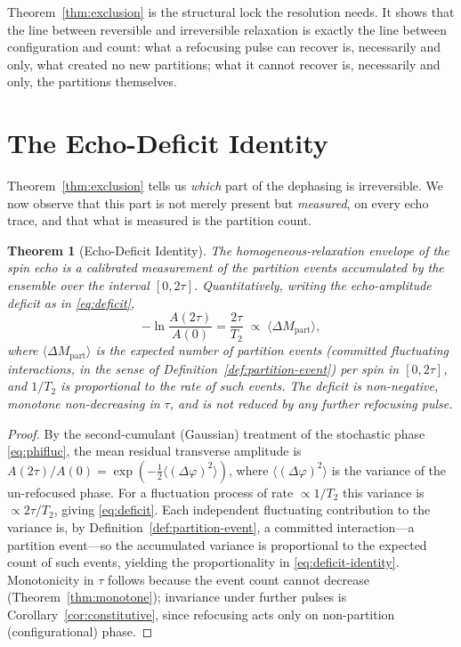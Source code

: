 \documentclass[11pt,a4paper]{article}
\theoremstyle{thmstyle}
\newtheorem{theorem}{Theorem}[section]
\theoremstyle{definition}
\theoremstyle{remark}
\newcommand{\Ttwo}{T_{2}}
\newcommand{\Count}{M}
\begin{document}
Theorem~\ref{thm:exclusion} is the structural lock the resolution
needs. It shows that the line between reversible and irreversible
relaxation is exactly the line between configuration and count: what a
refocusing pulse can recover is, necessarily and only, what created no
new partitions; what it cannot recover is, necessarily and only, the
partitions themselves.

\section{The Echo-Deficit Identity}
\label{sec:deficit}

Theorem~\ref{thm:exclusion} tells us \emph{which} part of the dephasing
is irreversible. We now observe that this part is not merely present but
\emph{measured}, on every echo trace, and that what is measured is the
partition count.

\begin{theorem}[Echo-Deficit Identity]
\label{thm:deficit}
The homogeneous-relaxation envelope of the spin echo is a calibrated
measurement of the partition events accumulated by the ensemble over the
interval $[0,2\tau]$. Quantitatively, writing the echo-amplitude deficit
as in \eqref{eq:deficit},
\begin{equation}
-\ln\frac{A(2\tau)}{A(0)} = \frac{2\tau}{\Ttwo}
\;\propto\; \langle \Delta\Count_{\mathrm{part}}\rangle,
\label{eq:deficit-identity}
\end{equation}
where $\langle\Delta\Count_{\mathrm{part}}\rangle$ is the expected number
of partition events (committed fluctuating interactions, in the sense of
Definition~\ref{def:partition-event}) per spin in $[0,2\tau]$, and
$1/\Ttwo$ is proportional to the rate of such events. The deficit is
non-negative, monotone non-decreasing in $\tau$, and is not reduced by
any further refocusing pulse.
\end{theorem}

\begin{proof}
By the second-cumulant (Gaussian) treatment of the stochastic phase
\eqref{eq:phifluc}, the mean residual transverse amplitude is
$A(2\tau)/A(0)=\exp(-\tfrac12\langle(\Delta\varphi)^{2}\rangle)$, where
$\langle(\Delta\varphi)^{2}\rangle$ is the variance of the un-refocused
phase. For a fluctuation process of rate $\propto1/\Ttwo$ this variance is
$\propto 2\tau/\Ttwo$, giving \eqref{eq:deficit}. Each independent
fluctuating contribution to the variance is, by
Definition~\ref{def:partition-event}, a committed interaction---a
partition event---so the accumulated variance is proportional to the
expected count of such events, yielding the proportionality in
\eqref{eq:deficit-identity}. Monotonicity in $\tau$ follows because the
event count cannot decrease (Theorem~\ref{thm:monotone}); invariance
under further pulses is Corollary~\ref{cor:constitutive}, since refocusing
acts only on non-partition (configurational) phase.
\end{proof}
\end{document}

